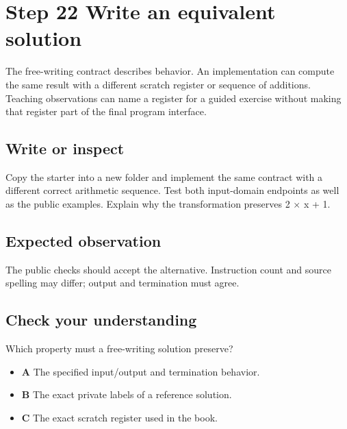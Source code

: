\section{Step 22 Write an equivalent
  solution}\label{001-console-calculation-s22-step-22-write-an-equivalent-solution}

The free-writing contract describes behavior. An implementation can
compute the same result with a different scratch register or sequence of
additions. Teaching observations can name a register for a guided
exercise without making that register part of the final program
interface.

\subsection{Write or
  inspect}\label{001-console-calculation-s22-write-or-inspect}

Copy the starter into a new folder and implement the same contract with
a different correct arithmetic sequence. Test both input-domain
endpoints as well as the public examples. Explain why the transformation
preserves 2 \ensuremath{\times} x + 1.

\subsection{Expected
  observation}\label{001-console-calculation-s22-expected-observation}

The public checks should accept the alternative. Instruction count and
source spelling may differ; output and termination must agree.

\subsection{Check your
  understanding}\label{001-console-calculation-s22-check-your-understanding}

Which property must a free-writing solution preserve?

\begin{itemize}
  \tightlist
  \item
        \textbf{A} The specified input/output and termination behavior.
  \item
        \textbf{B} The exact private labels of a reference solution.
  \item
        \textbf{C} The exact scratch register used in the book.
\end{itemize}
